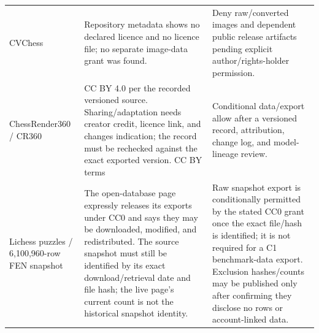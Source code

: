 \begin{longtable}{>{\raggedright\arraybackslash}p{.18\linewidth}>{\raggedright\arraybackslash}p{.39\linewidth}>{\raggedright\arraybackslash}p{.35\linewidth}}
CVChess & %
Repository metadata shows no declared licence and no licence file; no separate image-data grant was found. & %
Deny raw/converted images and dependent public release artifacts pending explicit author/rights-holder permission. \\ %

ChessRender360 / CR360 & %
CC BY 4.0 per the recorded versioned source. Sharing/adaptation needs creator credit, licence link, and changes indication; the record must be rechecked against the exact exported version. CC BY terms & %
Conditional data/export allow after a versioned record, attribution, change log, and model-lineage review. \\ %

Lichess puzzles / 6,100,960-row FEN snapshot & %
The open-database page expressly releases its exports under CC0 and says they may be downloaded, modified, and redistributed. The source snapshot must still be identified by its exact download/retrieval date and file hash; the live page's current count is not the historical snapshot identity. & %
Raw snapshot export is conditionally permitted by the stated CC0 grant once the exact file/hash is identified; it is not required for a C1 benchmark-data export. Exclusion hashes/counts may be published only after confirming they disclose no rows or account-linked data. \\ %

\end{longtable}
\endgroup
